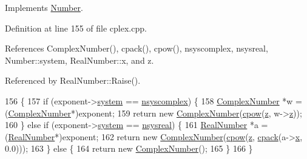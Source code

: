 Implements \hyperlink{structNumber_ad258f0357483820672fe2bc41a569dd3}{Number}.



Definition at line 155 of file cplex.\+cpp.



References Complex\+Number(), cpack(), cpow(), nsyscomplex, nsysreal, Number\+::system, Real\+Number\+::x, and z.



Referenced by Real\+Number\+::\+Raise().


\begin{DoxyCode}
156 \{
157     \textcolor{keywordflow}{if} (exponent->\hyperlink{structNumber_a2ceda5601c42288626e76b06878e7476}{system} == \hyperlink{numb_8h_a1475a201d2346881ce88dfbacf628c7da3b38c947375a3db3a4bc184a11c8ee42}{nsyscomplex}) \{
158         \hyperlink{structComplexNumber}{ComplexNumber} *w = (\hyperlink{structComplexNumber}{ComplexNumber}*)exponent;
159         \textcolor{keywordflow}{return} \textcolor{keyword}{new} \hyperlink{structComplexNumber_a610e9db9ff0ddb0140e30d235ab64e44}{ComplexNumber}(\hyperlink{complex_8h_a8d165b5dcf96f12ff8de000474dd020e}{cpow}(\hyperlink{structComplexNumber_a5f72da71f4ce0d88076a391369239042}{z}, w->\hyperlink{structComplexNumber_a5f72da71f4ce0d88076a391369239042}{z}));
160     \} \textcolor{keywordflow}{else}  \textcolor{keywordflow}{if} (exponent->\hyperlink{structNumber_a2ceda5601c42288626e76b06878e7476}{system} == \hyperlink{numb_8h_a1475a201d2346881ce88dfbacf628c7dae72cf8673109b15268d1c0837e8bff86}{nsysreal}) \{
161         \hyperlink{structRealNumber}{RealNumber} *a = (\hyperlink{structRealNumber}{RealNumber}*)exponent;
162         \textcolor{keywordflow}{return} \textcolor{keyword}{new} \hyperlink{structComplexNumber_a610e9db9ff0ddb0140e30d235ab64e44}{ComplexNumber}(\hyperlink{complex_8h_a8d165b5dcf96f12ff8de000474dd020e}{cpow}(\hyperlink{structComplexNumber_a5f72da71f4ce0d88076a391369239042}{z}, \hyperlink{complex_8h_a980e6e049f7902b05fc9eb5614b07a5c}{cpack}(a->\hyperlink{structRealNumber_ac33d80bee75448490199a0aa48ccce1e}{x}, 0.0)));
163     \} \textcolor{keywordflow}{else} \{
164         \textcolor{keywordflow}{return} \textcolor{keyword}{new} \hyperlink{structComplexNumber_a610e9db9ff0ddb0140e30d235ab64e44}{ComplexNumber}();
165     \}
166 \}
\end{DoxyCode}


